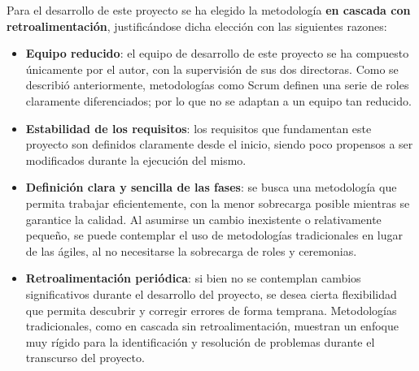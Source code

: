     Para el desarrollo de este proyecto se ha elegido la metodología \textbf{en cascada con retroalimentación}, justificándose dicha elección con las siguientes razones:
    
    \begin{itemize}
        \item \textbf{Equipo reducido}: el equipo de desarrollo de este proyecto se ha compuesto únicamente por el autor, con la supervisión de sus dos directoras. Como se describió anteriormente, metodologías como Scrum definen una serie de roles claramente diferenciados; por lo que no se adaptan a un equipo tan reducido.
        \item \textbf{Estabilidad de los requisitos}: los requisitos que fundamentan este proyecto son definidos claramente desde el inicio, siendo poco propensos a ser modificados durante la ejecución del mismo. 
        \item \textbf{Definición clara y sencilla de las fases}: se busca una metodología que permita trabajar eficientemente, con la menor sobrecarga posible mientras se garantice la calidad. Al asumirse un cambio inexistente o relativamente pequeño, se puede contemplar el uso de metodologías tradicionales en lugar de las ágiles, al no necesitarse la sobrecarga de roles y ceremonias. 
        \item \textbf{Retroalimentación periódica}: si bien no se contemplan cambios significativos durante el desarrollo del proyecto, se desea cierta flexibilidad que permita descubrir y corregir errores de forma temprana. Metodologías tradicionales, como en cascada sin retroalimentación, muestran un enfoque muy rígido para la identificación y resolución de problemas durante el transcurso del proyecto.
    \end{itemize}
